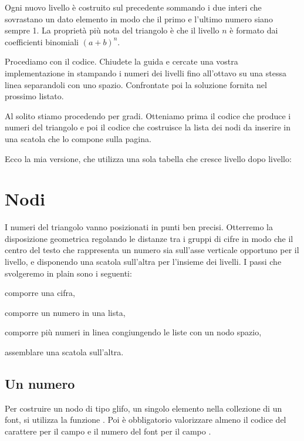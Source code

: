 Ogni nuovo livello è costruito sul precedente sommando i due interi che
sovrastano un dato elemento in modo che il primo e l'ultimo numero siano sempre
1. La proprietà più nota del triangolo è che il livello \( n \) è formato dai
coefficienti binomiali \( (a + b)^n \).

Procediamo con il codice. Chiudete la guida e cercate una vostra implementazione
in \LuaTeX{} stampando i numeri dei livelli fino all'ottavo su una stessa linea
separandoli con uno spazio. Confrontate poi la soluzione fornita nel prossimo
listato.

Al solito stiamo procedendo per gradi. Otteniamo prima il codice che produce i
numeri del triangolo e poi il codice che costruisce la lista dei nodi da
inserire in una scatola che lo compone sulla pagina.

Ecco la mia versione, che utilizza una sola tabella che cresce livello dopo
livello:


\section{Nodi}

I numeri del triangolo vanno posizionati in punti ben precisi. Otterremo
la disposizione geometrica regolando le distanze tra i gruppi di cifre in modo
che il centro del testo che rappresenta un numero sia sull'asse verticale
opportuno per il livello, e disponendo una scatola sull'altra per l'insieme dei
livelli. I passi che svolgeremo in plain \LuaTeX{} sono i seguenti:
\begin{compactenumerate}
\item comporre una cifra,
\item comporre un numero in una lista,
\item comporre più numeri in linea congiungendo le liste con un nodo spazio,
\item assemblare una scatola sull'altra.
\end{compactenumerate}


\subsection{Un numero}

Per costruire un nodo di tipo glifo, un singolo elemento nella collezione
di un font, si utilizza la funzione . Poi è obbligatorio
valorizzare almeno il codice del carattere per il campo  e il numero
del font per il campo .

